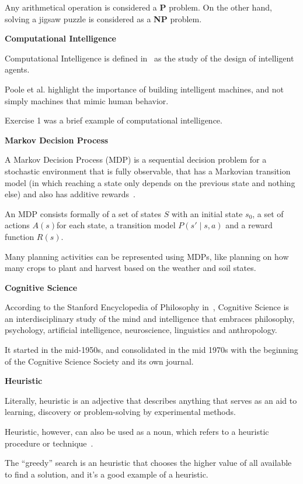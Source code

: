 \documentclass[titlepage, letterpaper, fleqn]{article}
\newcommand{\spacepls}{\vspace{5mm}}
\newcommand{\defys}[1]{
	\spacepls %
	\textbf{#1}
}
\begin{document}
Any arithmetical operation is considered a \textbf{P} problem. On the other hand, solving a jigsaw puzzle is considered as a \textbf{NP} problem.

\defys{Computational Intelligence}

Computational Intelligence is defined in~\cite{CI} as the study of the design of intelligent agents.

Poole et al. highlight the importance of building intelligent machines, and not simply machines that mimic human behavior.

Exercise 1 was a brief example of computational intelligence.

\pagebreak

\defys{Markov Decision Process}

A Markov Decision Process (MDP) is a sequential decision problem for a stochastic environment that is fully observable, that has a Markovian transition model (in which reaching a state only depends on the previous state and nothing else) and also has additive rewards~\cite{MDP}.

An MDP consists formally of a set of states \(S\) with an initial state \(s_0\), a set of actions \(A(s)\)for each state, a transition model \(P(s' \mid s,a)\) and a reward function \(R(s)\).

Many planning activities can be represented using MDPs, like planning on how many crops to plant and harvest based on the weather and soil states.

\defys{Cognitive Science}

According to the Stanford Encyclopedia of Philosophy in~\cite{CogSci}, Cognitive Science is an interdisciplinary study of the mind and intelligence that embraces philosophy, psychology, artificial intelligence, neuroscience, linguistics and anthropology.

It started in the mid-1950s, and consolidated in the mid 1970s with the beginning of the Cognitive Science Society and its own journal.

\defys{Heuristic}

Literally, heuristic is an adjective that describes anything that serves as an aid to learning, discovery or problem-solving by experimental methods.

Heuristic, however, can also be used as a noun, which refers to a heuristic procedure or technique~\cite{heur}.

The ``greedy'' search is an heuristic that chooses the higher value of all available to find a solution, and it's a good example of a heuristic.
\end{document}
